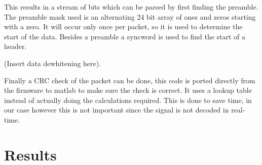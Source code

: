 \documentclass{IEEEtran}
\begin{document}
This results in a stream of bits which can be parsed by first finding the preamble. The preamble mask used is an alternating 24 bit array of ones and zeros starting with a zero. It will occur only once per packet, so it is used to determine the start of the data. Besides a preamble a syncword is used to find the start of a header. 

(Insert data dewhitening here).

Finally a CRC check of the packet can be done, this code is ported directly from the firmware to matlab to make sure the check is correct. It uses a lookup table instead of actually doing the calculations required. This is done to save time, in our case however this is not important since the signal is not decoded in real-time.

\section{Results}
\end{document}

